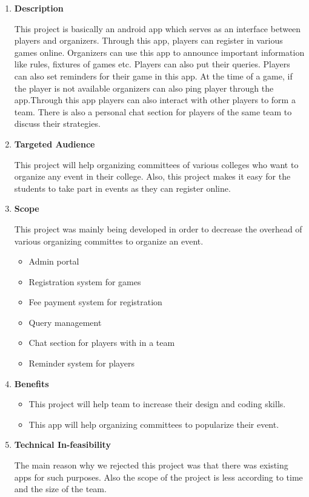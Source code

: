 \documentclass[fleqn,10pt]{../SelfArx} %
\begin{document}
\vspace{0.5cm}
\begin{enumerate}
\item \textbf{Description}

This project is basically an android app which serves as an interface between players and organizers. Through this app, players can register in various games online. Organizers can use this app to announce important information like rules, fixtures of games etc. Players can also put their queries. Players can also set reminders for their game in this app. At the time of a game, if the player is not available organizers can also ping player through the app.Through this app players can also interact with other players to form a team. There is also a personal chat section for players of the same team to discuss their strategies.

\item \textbf{ Targeted Audience}

This project will help organizing committees of various colleges who want to organize any event in their college. Also, this project makes it easy for the students to take part in events as they can register online.

\item \textbf{Scope}

This project was mainly being developed in order to decrease the overhead of various organizing committes to organize an event.

\begin{itemize}
    \item   Admin portal
 \item  Registration system for games
 \item  Fee payment system for registration
 \item  Query management
 \item  Chat section for players with in a team
 \item  Reminder system for players
\end{itemize}



\item \textbf{Benefits}

\begin{itemize}
    \item   This project will help team to increase their design and coding skills.
    \item   This app will help organizing committees to popularize their event.
  
\end{itemize}

\item \textbf{ Technical In-feasibility }

The main reason why we rejected this project was that there was existing apps for such purposes. Also the scope of the project is less according to time and the size of the team. 
\end{enumerate}
\end{document}
